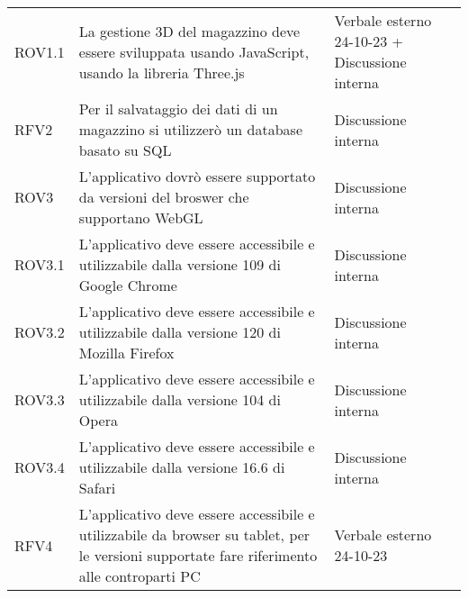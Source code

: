 \begin{xltabular}{\textwidth}{ p{0.2\textwidth} | X | p{0.2\textwidth} }
    ROV1.1& La gestione 3D del magazzino deve essere sviluppata usando JavaScript, usando la libreria Three.js & Verbale esterno 24-10-23 + Discussione interna \\
    RFV2& Per il salvataggio dei dati di un magazzino si utilizzerò un database basato su SQL & Discussione interna\\
    ROV3& L'applicativo dovrò essere supportato da versioni del broswer che supportano WebGL & Discussione interna\\
    ROV3.1& L'applicativo deve essere accessibile e utilizzabile dalla versione 109 di Google Chrome & Discussione interna\\
    ROV3.2& L'applicativo deve essere accessibile e utilizzabile dalla versione 120 di Mozilla Firefox & Discussione interna\\
    ROV3.3& L'applicativo deve essere accessibile e utilizzabile dalla versione 104 di Opera & Discussione interna\\
    ROV3.4& L'applicativo deve essere accessibile e utilizzabile dalla versione 16.6 di Safari & Discussione interna\\
    RFV4& L'applicativo deve essere accessibile e utilizzabile da browser su tablet, per le versioni supportate fare riferimento alle controparti PC & Verbale esterno 24-10-23\\

    \hline
\end{xltabular}


\renewcommand{\arraystretch}{1.25}
